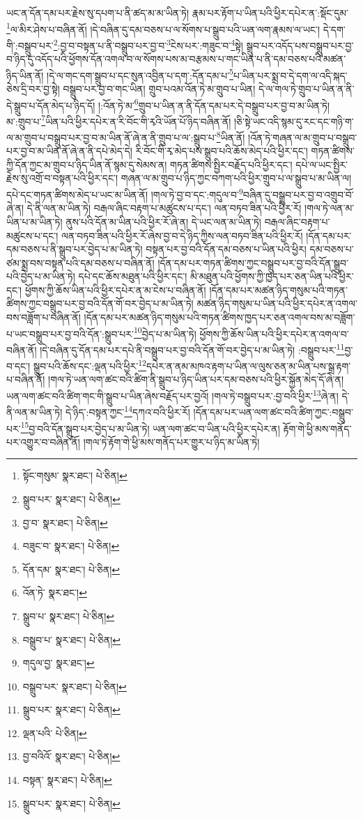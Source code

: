 ཡང་ན་དོན་དམ་པར་རྗེས་སུ་དཔག་པ་ནི་ཚད་མ་མ་ཡིན་ཏེ། རྣམ་པར་རྟོག་པ་ཡིན་པའི་ཕྱིར་དཔེར་ན་:སྡོང་དུམ་\footnote{སྟོང་གསུམ་  སྣར་ཐང་།  པེ་ཅིན། }ལ་མིར་ཤེས་པ་བཞིན་ནོ། །དེ་བཞིན་དུ་དམ་བཅས་པ་ལ་སོགས་པ་སྒྲུབ་པའི་ཡན་ལག་རྣམས་ལ་ཡང་། དེ་དག་གི་:བསྒྲུབ་པར་\footnote{སྒྲུབ་པར་  སྣར་ཐང་།  པེ་ཅིན། }:བྱ་བ་བསྟན་པ་ནི་བསྒྲུབ་པར་བྱ་བ་\footnote{བྱ་བ་  སྣར་ཐང་།  པེ་ཅིན། }ངེས་པར་:གཟུང་བ་\footnote{བཟུང་བ་  སྣར་ཐང་།  པེ་ཅིན། }སྟེ། སྒྲུབ་པར་འདོད་པས་བསྒྲུབ་པར་བྱ་བ་ཉིད་དུ་འདོད་པའི་ཕྱོགས་དོན་འགལ་བ་ལ་སོགས་པས་མ་བརྩམས་པ་གང་ཡིན་པ་ནི་དམ་བཅས་པའི་མཚན་ཉིད་ཡིན་ནོ། །དེ་ལ་གང་དག་སྒྲུབ་པ་དང་སུན་འབྱིན་པ་དག་:དོན་དམ་པ་\footnote{དོན་དམ་  སྣར་ཐང་།  པེ་ཅིན། }པ་ཡིན་པར་སྨྲ་བ་དེ་དག་ལ་འདི་སྐད་ཅེས་དྲི་བར་བྱ་སྟེ། བསྒྲུབ་པར་བྱ་བ་གང་ཡིན། གྲུབ་པའམ་འོན་ཏེ་མ་གྲུབ་པ་ཡིན། དེ་ལ་གལ་ཏེ་གྲུབ་པ་ཡིན་ན་ནི་དེ་སྒྲུབ་པ་དོན་མེད་པ་ཉིད་དོ། །:འོན་ཏེ་མ་\footnote{འོན་ཏེ་  སྣར་ཐང་། }གྲུབ་པ་ཡིན་ན་ནི་དོན་དམ་པར་དེ་བསྒྲུབ་པར་བྱ་བ་མ་ཡིན་ཏེ། མ་:གྲུབ་པ་\footnote{སྒྲུབ་པ་  སྣར་ཐང་།  པེ་ཅིན། }ཡིན་པའི་ཕྱིར་དཔེར་ན་རི་བོང་གི་རྭའི་ཡོན་པོ་ཉིད་བཞིན་ནོ། །ཅི་སྟེ་ཡང་འདི་སྙམ་དུ་རང་དང་གཉི་ག་ལ་མ་གྲུབ་པ་བསྒྲུབ་པར་བྱ་བ་མ་ཡིན་ནོ་ཞེ་ན་ནི་གྲུབ་པ་ལ་:སྒྲུབ་པ་\footnote{བསྒྲུབ་པ་  སྣར་ཐང་།  པེ་ཅིན། }ཡིན་ནོ། །འོན་ཏེ་གཞན་ལ་མ་གྲུབ་པ་བསྒྲུབ་པར་བྱ་བ་མ་ཡིན་ནོ་ཞེ་ན་ནི་དཔེ་མེད་དེ། རི་བོང་གི་རྭ་མེད་པས་སྒྲུབ་པའི་ཆོས་མེད་པའི་ཕྱིར་དང་། གཏན་ཚིགས་ཀྱི་དོན་ཀྱང་མ་གྲུབ་པ་ཉིད་ཡིན་ནོ་སྙམ་དུ་སེམས་ན། གཏན་ཚིགས་སྤྱིར་བརྗོད་པའི་ཕྱིར་དང་། དཔེ་ལ་ཡང་སྤྱིར་རྗེས་སུ་འགྲོ་བ་བསྟན་པའི་ཕྱིར་དང་། གཞན་ལ་མ་གྲུབ་པ་ཉིད་ཀྱང་བཀག་པའི་ཕྱིར་གྲུབ་པ་ལ་སྒྲུབ་པ་མ་ཡིན་ལ། དཔེ་དང་གཏན་ཚིགས་མེད་པ་ཡང་མ་ཡིན་ནོ། །གལ་ཏེ་བྱ་བ་དང་:གདུལ་བ་\footnote{གདུལ་བྱ་  སྣར་ཐང་། }བཞིན་དུ་བསྒྲུབ་པར་བྱ་བ་འགྲུབ་བོ་ཞེ་ན། དེ་ནི་ལན་མ་ཡིན་ཏེ། བརྒལ་ཞིང་བརྟག་པ་མཚུངས་པ་དང་། ལན་བཏབ་ཟིན་པའི་ཕྱིར་རོ། །གལ་ཏེ་ལན་མ་ཡིན་པ་མ་ཡིན་ཏེ། ནུས་པའི་དོན་མ་ཡིན་པའི་ཕྱིར་རོ་ཞེ་ན། དེ་ཡང་ལན་མ་ཡིན་ཏེ། བརྒལ་ཞིང་བརྟག་པ་མཚུངས་པ་དང་། ལན་བཏབ་ཟིན་པའི་ཕྱིར་རོ་ཞེས་བྱ་བ་དེ་ཉིད་ཀྱིས་ལན་བཏབ་ཟིན་པའི་ཕྱིར་རོ། །དོན་དམ་པར་དམ་བཅས་པ་ནི་སྒྲུབ་པར་བྱེད་པ་མ་ཡིན་ཏེ། བསྟན་པར་བྱ་བའི་དོན་དམ་བཅས་པ་ཡིན་པའི་ཕྱིར། དམ་བཅས་པ་ཙམ་སྨྲ་བས་བསྟན་པའི་དམ་བཅས་པ་བཞིན་ནོ། །དོན་དམ་པར་གཏན་ཚིགས་ཀྱང་བསྒྲུབ་པར་བྱ་བའི་དོན་སྒྲུབ་པའི་བྱེད་པ་མ་ཡིན་ཏེ། དཔེ་དང་ཆོས་མཐུན་པའི་ཕྱིར་དང་། མི་མཐུན་པའི་ཕྱོགས་ཀྱི་ཁྱད་པར་ཅན་ཡིན་པའི་ཕྱིར་དང་། ཕྱོགས་ཀྱི་ཆོས་ཡིན་པའི་ཕྱིར་དཔེར་ན་མ་ངེས་པ་བཞིན་ནོ། །དོན་དམ་པར་མཚན་ཉིད་གསུམ་པའི་གཏན་ཚིགས་ཀྱང་བསྒྲུབ་པར་བྱ་བའི་དོན་གོ་བར་བྱེད་པ་མ་ཡིན་ཏེ། མཚན་ཉིད་གསུམ་པ་ཡིན་པའི་ཕྱིར་དཔེར་ན་འགལ་བས་བཟློག་པ་བཞིན་ནོ། །དོན་དམ་པར་མཚན་ཉིད་གསུམ་པའི་གཏན་ཚིགས་ཁྱད་པར་ཅན་འགལ་བས་མ་བཟློག་པ་ཡང་བསྒྲུབ་པར་བྱ་བའི་དོན་:སྒྲུབ་པར་\footnote{བསྒྲུབ་པར་  སྣར་ཐང་།  པེ་ཅིན། }བྱེད་པ་མ་ཡིན་ཏེ། ཕྱོགས་ཀྱི་ཆོས་ཡིན་པའི་ཕྱིར་དཔེར་ན་འགལ་བ་བཞིན་ནོ། །དེ་བཞིན་དུ་དོན་དམ་པར་དཔེ་ནི་བསྒྲུབ་པར་བྱ་བའི་དོན་གོ་བར་བྱེད་པ་མ་ཡིན་ཏེ། :བསྒྲུབ་པར་\footnote{སྒྲུབ་པར་  སྣར་ཐང་།  པེ་ཅིན། }བྱ་བ་དང་། སྒྲུབ་པའི་ཆོས་དང་:ལྡན་པའི་ཕྱིར་\footnote{ལྡན་པའི་  པེ་ཅིན། }དཔེར་ན་ནམ་མཁའ་རྟག་པ་ཡིན་ལ་ལུས་ཅན་མ་ཡིན་པས་སྒྲ་རྟག་པ་བཞིན་ནོ། །གལ་ཏེ་ཡན་ལག་ཚང་བའི་ཚིག་ནི་སྒྲུབ་པ་ཉིད་ཡིན་པར་དམ་བཅས་པའི་ཕྱིར་སྐྱོན་མེད་དོ་ཞེ་ན། ཡན་ལག་ཚང་བའི་ཚིག་གང་གི་སྒྲུབ་པ་ཡིན་ཞེས་བརྗོད་པར་བྱའོ། །གལ་ཏེ་བསྒྲུབ་པར་:བྱ་བའི་ཕྱིར་\footnote{བྱ་བའིའོ་  སྣར་ཐང་།  པེ་ཅིན། }ཞེ་ན། དེ་ནི་ལན་མ་ཡིན་ཏེ། དེ་ཉིད་:བསྟན་ཀྱང་\footnote{བསྟན་  སྣར་ཐང་།  པེ་ཅིན། }དཀའ་བའི་ཕྱིར་རོ། །དོན་དམ་པར་ཡན་ལག་ཚང་བའི་ཚིག་ཀྱང་:བསྒྲུབ་པར་\footnote{སྒྲུབ་པར་  སྣར་ཐང་།  པེ་ཅིན། }བྱ་བའི་དོན་སྒྲུབ་པར་བྱེད་པ་མ་ཡིན་ཏེ། ཡན་ལག་ཚང་བ་ཡིན་པའི་ཕྱིར་དཔེར་ན། རྟོག་གེ་ཕྱི་མས་གནོད་པར་འགྱུར་བ་བཞིན་ནོ། །གལ་ཏེ་རྟོག་གེ་ཕྱི་མས་གནོད་པར་གྱུར་པ་ཉིད་མ་ཡིན་ཏེ། 